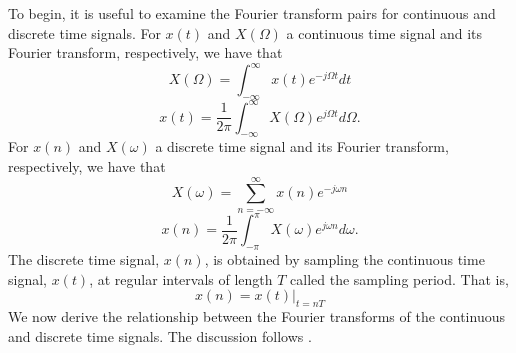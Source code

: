 	To begin, it is useful to examine the 
Fourier transform pairs for continuous and discrete
time signals.  For $x(t)$ and $X(\Omega)$ a continuous time signal and
its Fourier transform, respectively, we have that
%
\begin{equation}
X(\Omega)=\int_{-\infty}^{\infty}x(t)e^{-j\Omega t}dt
\label{e0.1}
\end{equation}
%
%
\begin{equation}
x(t)=\frac{1}{2\pi}\int_{-\infty}^{\infty}X(\Omega)e^{j\Omega t}d\Omega.
\label{e0.2}
\end{equation}
%
For $x(n)$ and $X(\omega)$ a discrete time signal and
its Fourier transform, respectively, we have that
%
\begin{equation}
X(\omega)=\sum_{n=-\infty}^{\infty}x(n)e^{-j\omega n}
\label{e0.3}
\end{equation}
%
%
\begin{equation}
x(n)=\frac{1}{2\pi}\int_{-\pi}^{\pi}X(\omega)e^{j\omega n}d\omega.
\label{e0.4}
\end{equation}
%
The discrete time signal, $x(n)$, is obtained by
sampling the continuous time signal, $x(t)$, at regular
intervals of length $T$ called the sampling period.  
That is,
%
\begin{equation}
x(n)=x(t)|_{t=nT}
\label{e0.5}
\end{equation}
%
We now derive the relationship between the Fourier
transforms of the continuous and discrete time signals.
The discussion follows \cite{oppen}.

